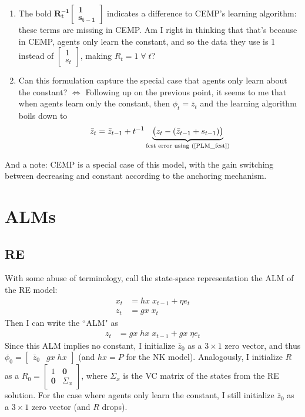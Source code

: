 \documentclass[11pt]{article}
\renewcommand{\[}{\begin{equation}}
\renewcommand{\]}{\end{equation}}
\begin{document}
\begin{enumerate}
\item The bold $\mathbf{R_t^{-1}}\begin{bmatrix} \mathbf{1} \\ \mathbf{s_{t-1}} \end{bmatrix}$ indicates a difference to CEMP's learning algorithm: these terms are missing in CEMP. Am I right in thinking that that's because in CEMP, agents only learn the constant, and so the data they use is 1 instead of $\begin{bmatrix} 1 \\ s_{t} \end{bmatrix}$, making $R_t = 1 \; \forall \;t$?
\item Can this formulation capture the special case that agents only learn about the constant? $\Leftrightarrow$ Following up on the previous point, it seems to me that when agents learn only the constant, then $\phi_t = \bar{z}_{t}$ and the learning algorithm boils down to
\begin{equation}
\bar{z}_{t} = \bar{z}_{t-1} +t^{-1}\underbrace{\big(z_{t} -(\bar{z}_{t-1}+s_{t-1}) \big)}_{\text{fcst error using (\ref{PLM_fcst})} }
\end{equation}
\end{enumerate}
And a note: CEMP is a special case of this model, with the gain switching between decreasing and constant according to the anchoring mechanism. 

\section{ALMs}
\subsection{RE}
With some abuse of terminology, call the state-space representation the ALM of the RE model:
\begin{align}
x_{t} & = hx \; x_{t-1} + \eta e_t \label{state_eq}\\
z_t & = gx \; x_t \label{obs_eq}
\end{align}
Then I can write the ``ALM" as
\begin{align}
z_t & = gx \; hx \; x_{t-1} + gx \; \eta e_t  \label{ALM_RE}
\end{align}
Since this ALM implies no constant, I initialize $\bar{z}_0$ as a $3\times1$ zero vector, and thus $\phi_0 = \begin{bmatrix} \bar{z}_0 & gx \; hx\end{bmatrix} $ (and $hx = P$ for the NK model). Analogously, I initialize $R$ as a $R_0 = \begin{bmatrix} 1 & \mathbf{0} \\ \mathbf{0} & \Sigma_x \end{bmatrix}$, where $\Sigma_x$ is the VC matrix of the states from the RE solution. For the case where agents only learn the constant, I still initialize $\bar{z}_0$ as a $3\times1$ zero vector (and $R$ drops).
\end{document}
